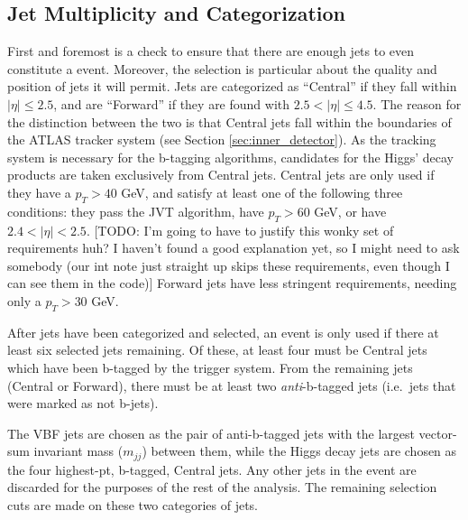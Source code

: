     \subsection{Jet Multiplicity and Categorization}
        
        First and foremost is a check to ensure that there are enough jets to even constitute a \vbfproc event.
        Moreover, the selection is particular about the quality and position of jets it will permit.
        Jets are categorized as ``Central'' if they fall within $|\eta| \leq 2.5$,
            and are ``Forward'' if they are found with $ 2.5 < |\eta| \leq 4.5 $.
        The reason for the distinction between the two is that Central jets fall within the boundaries of the ATLAS tracker system
            (see Section \ref{sec:inner_detector}).
        As the tracking system is necessary for the b-tagging algorithms,
            candidates for the Higgs' decay products are taken exclusively from Central jets.
        Central jets are only used if they have a $p_T > 40$ GeV, and satisfy at least one of the following three conditions:
            they pass the JVT algorithm, have $p_T > 60$ GeV, or have $2.4 < |\eta| < 2.5$.
        [TODO: I'm going to have to justify this wonky set of requirements huh?
            I haven't found a good explanation yet, so I might need to ask somebody
            (our int note just straight up skips these requirements, even though I can see them in the code)]
        Forward jets have less stringent requirements, needing only a $p_T > 30$ GeV.

        After jets have been categorized and selected, an event is only used if there at least six selected jets remaining.
        Of these, at least four must be Central jets which have been b-tagged by the trigger system.
        From the remaining jets (Central or Forward), there must be at least two \textit{anti}-b-tagged jets
            (i.e.\ jets that were marked as not b-jets).

        The VBF jets are chosen as the pair of anti-b-tagged jets with the largest vector-sum invariant mass ($m_{jj}$) between them,
            while the Higgs decay jets are chosen as the four highest-pt, b-tagged, Central jets.
        Any other jets in the event are discarded for the purposes of the rest of the analysis.
        The remaining selection cuts are made on these two categories of jets.
        



